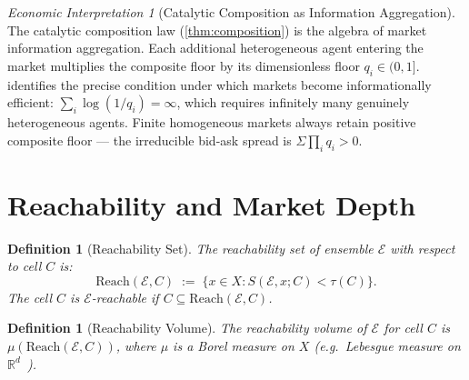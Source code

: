 \documentclass[twocolumn,11pt,a4paper]{article}
\newtheorem{definition}[theorem]{Definition}
\theoremstyle{remark}
\newtheorem{econinterp}[theorem]{Economic Interpretation}
\newcommand{\R}{\mathbb{R}}
\newcommand{\Reach}{\mathrm{Reach}}
\newcommand{\tol}{\tau}
\newcommand{\Ens}{\mathcal{E}}            %
\begin{document}
\begin{econinterp}[Catalytic Composition as Information Aggregation]
\label{ei:composition}
The catalytic composition law (\cref{thm:composition}) is the algebra of
market information aggregation.  Each additional heterogeneous agent
entering the market multiplies the composite floor by its dimensionless
floor $q_i \in (0,1]$.   identifies the precise
condition under which markets become informationally efficient:
$\sum_i \log(1/q_i) = \infty$, which requires infinitely many genuinely
heterogeneous agents.  Finite homogeneous markets always retain positive
composite floor — the irreducible bid-ask spread is $\Sigma \prod_i q_i > 0$.
\end{econinterp}

\section{Reachability and Market Depth}
\label{sec:reachability}

\begin{definition}[Reachability Set]
\label{def:reach}
The \emph{reachability set} of ensemble $\Ens$ with respect to cell $C$ is:
\[
  \Reach(\Ens, C) \;:=\; \bigl\{x \in X : S(\Ens, x; C) < \tol(C)\bigr\}.
\]
The cell $C$ is \emph{$\Ens$-reachable} if $C \subseteq \Reach(\Ens, C)$.
\end{definition}

\begin{definition}[Reachability Volume]
\label{def:reach-vol}
The \emph{reachability volume} of $\Ens$ for cell $C$ is $\mu(\Reach(\Ens,
C))$, where $\mu$ is a Borel measure on $X$ (e.g.\ Lebesgue measure on
$\R^d$~\cite{halmos1950}).
\end{definition}
\end{document}
